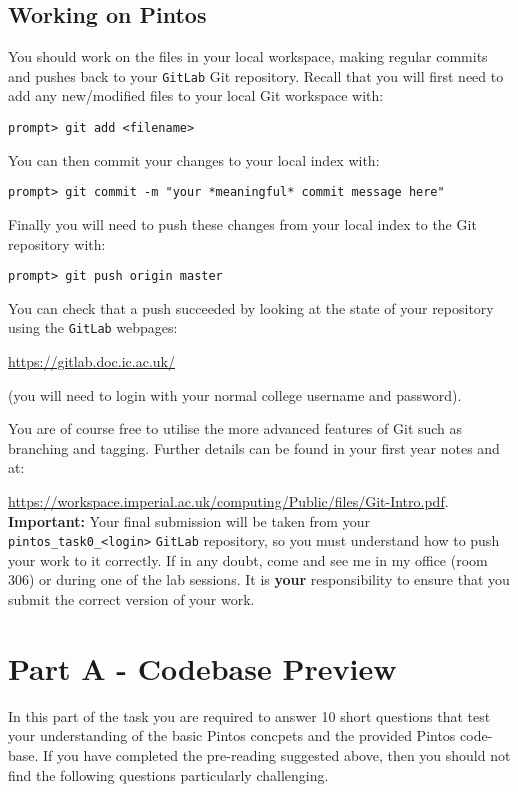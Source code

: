 \documentclass[a4paper,12pt]{article}
\newcommand{\shell}[1]{\lstinline!#1!}
\begin{document}
\subsection*{Working on Pintos}
You should work on the files in your local workspace, making regular commits and pushes back to your \shell{GitLab} Git repository.
Recall that you will first need to add any new/modified files to your local Git workspace with:
%
\begin{lstlisting}[style=shell]
  prompt> git add <filename>
\end{lstlisting}
%
You can then commit your changes to your local index with:
%
\begin{lstlisting}[style=shell]
  prompt> git commit -m "your *meaningful* commit message here"
\end{lstlisting}
%
Finally you will need to push these changes from your local index to the Git repository with:
%
\begin{lstlisting}[style=shell]
  prompt> git push origin master
\end{lstlisting}
%
You can check that a push succeeded by looking at the state of your repository using the \shell{GitLab} webpages: 

\url{https://gitlab.doc.ic.ac.uk/}

\noindent (you will need to login with your normal college username and password).

You are of course free to utilise the more advanced features of Git such as branching and tagging.
Further details can be found in your first year notes and at:

\url{https://workspace.imperial.ac.uk/computing/Public/files/Git-Intro.pdf}.\\

{\bf Important:} Your final submission will be taken from your \shell{pintos_task0_<login>} \shell{GitLab} repository, 
so you must understand how to push your work to it correctly. 
If in any doubt, come and see me in my office (room 306) or during one of the lab sessions.
It is {\bf your} responsibility to ensure that you submit the correct version of your work.


\section*{Part A - Codebase Preview}
In this part of the task you are required to answer 10 short questions that test your understanding of the basic Pintos concpets 
and the provided Pintos code-base.
If you have completed the pre-reading suggested above, then you should not find the following questions particularly challenging.
\end{document}
